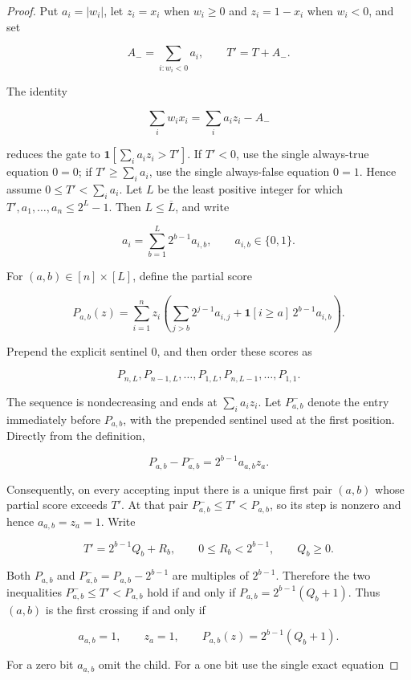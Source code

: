 \documentclass[11pt,letterpaper]{article}
\theoremstyle{definition}
\theoremstyle{remark}
\begin{document}
\begin{proof} Put \(a_i=|w_i|\), let \(z_i=x_i\) when \(w_i\ge0\) and
\(z_i=1-x_i\) when \(w_i<0\), and set

\[
A_- = \sum_{i:w_i<0}a_i,
\qquad
T'=T+A_-.
\]

The identity

\[
\sum_iw_ix_i=\sum_i a_i z_i-A_-
\]

reduces the gate to \(\mathbf1[\sum_i a_i z_i>T']\). If \(T'<0\), use
the single always-true equation \(0=0\); if \(T'\ge\sum_i a_i\), use the
single always-false equation \(0=1\). Hence assume
\(0\le T'<\sum_i a_i\). Let \(L\) be the least positive integer for
which \(T',a_1,\ldots,a_n\le2^L-1\). Then \(L\le\overline L\), and write

\[
a_i=\sum_{b=1}^L2^{b-1}a_{i,b},
\qquad a_{i,b}\in\{0,1\}.
\]

For \((a,b)\in[n]\times[L]\), define the partial score

\[
P_{a,b}(z)
={}
\sum_{i=1}^n z_i
\left(
\sum_{j>b}2^{j-1}a_{i,j}
{}+{}
\mathbf1[i\ge a]\,2^{b-1}a_{i,b}
\right).
\]

Prepend the explicit sentinel \(0\), and then order these scores as

\[
P_{n,L},P_{n-1,L},\ldots,P_{1,L},
P_{n,L-1},\ldots,P_{1,1}.
\tag{A.12.0a}
\]

The sequence is nondecreasing and ends at \(\sum_i a_i z_i\). Let
\(P^-_{a,b}\) denote the entry immediately before \(P_{a,b}\), with the
prepended sentinel used at the first position. Directly from the
definition,

\[
P_{a,b}-P^-_{a,b}=2^{b-1}a_{a,b}z_a.
\]

Consequently, on every accepting input there is a unique first pair
\((a,b)\) whose partial score exceeds \(T'\). At that pair
\(P^-_{a,b}\le T'<P_{a,b}\), so its step is nonzero and hence
\(a_{a,b}=z_a=1\). Write

\[
T'=2^{b-1}Q_b+R_b,
\qquad
0\le R_b<2^{b-1},
\qquad
Q_b\ge0.
\]

Both \(P_{a,b}\) and \(P^-_{a,b}=P_{a,b}-2^{b-1}\) are multiples of
\(2^{b-1}\). Therefore the two inequalities \(P^-_{a,b}\le T'<P_{a,b}\)
hold if and only if \(P_{a,b}=2^{b-1}(Q_b+1)\). Thus \((a,b)\) is the
first crossing if and only if

\[
a_{a,b}=1,
\qquad z_a=1,
\qquad
P_{a,b}(z)=2^{b-1}(Q_b+1).
\tag{A.12.0b}
\]

For a zero bit \(a_{a,b}\) omit the child. For a one bit use the single
exact equation


\end{proof}
\end{document}
